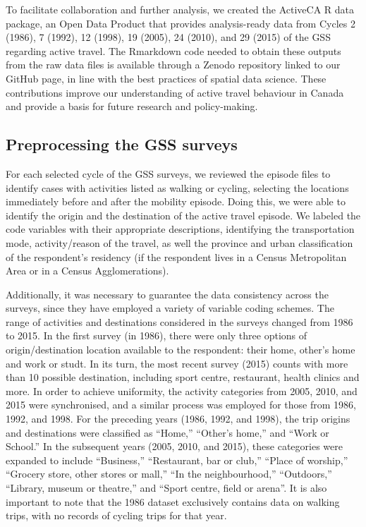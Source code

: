 \documentclass[preprint, 3p,
authoryear]{elsarticle} %
\begin{document}
To facilitate collaboration and further analysis, we created the
ActiveCA R data package, an Open Data Product that provides
analysis-ready data from Cycles 2 (1986), 7 (1992), 12 (1998), 19
(2005), 24 (2010), and 29 (2015) of the GSS regarding active travel. The
Rmarkdown code needed to obtain these outputs from the raw data files is
available through a Zenodo repository linked to our GitHub page, in line
with the best practices of spatial data science. These contributions
improve our understanding of active travel behaviour in Canada and
provide a basis for future research and policy-making.

\hypertarget{preprocessing-the-gss-surveys}{%
\subsection{Preprocessing the GSS
surveys}\label{preprocessing-the-gss-surveys}}

For each selected cycle of the GSS surveys, we reviewed the episode
files to identify cases with activities listed as walking or cycling,
selecting the locations immediately before and after the mobility
episode. Doing this, we were able to identify the origin and the
destination of the active travel episode. We labeled the code variables
with their appropriate descriptions, identifying the transportation
mode, activity/reason of the travel, as well the province and urban
classification of the respondent's residency (if the respondent lives in
a Census Metropolitan Area or in a Census Agglomerations).

Additionally, it was necessary to guarantee the data consistency across
the surveys, since they have employed a variety of variable coding
schemes. The range of activities and destinations considered in the
surveys changed from 1986 to 2015. In the first survey (in 1986), there
were only three options of origin/destination location available to the
respondent: their home, other's home and work or studt. In its turn, the
most recent survey (2015) counts with more than 10 possible destination,
including sport centre, restaurant, health clinics and more. In order to
achieve uniformity, the activity categories from 2005, 2010, and 2015
were synchronised, and a similar process was employed for those from
1986, 1992, and 1998. For the preceding years (1986, 1992, and 1998),
the trip origins and destinations were classified as ``Home,'' ``Other's
home,'' and ``Work or School.'' In the subsequent years (2005, 2010, and
2015), these categories were expanded to include ``Business,''
``Restaurant, bar or club,'' ``Place of worship,'' ``Grocery store,
other stores or mall,'' ``In the neighbourhood,'' ``Outdoors,''
``Library, museum or theatre,'' and ``Sport centre, field or arena''. It
is also important to note that the 1986 dataset exclusively contains
data on walking trips, with no records of cycling trips for that year.
\end{document}
